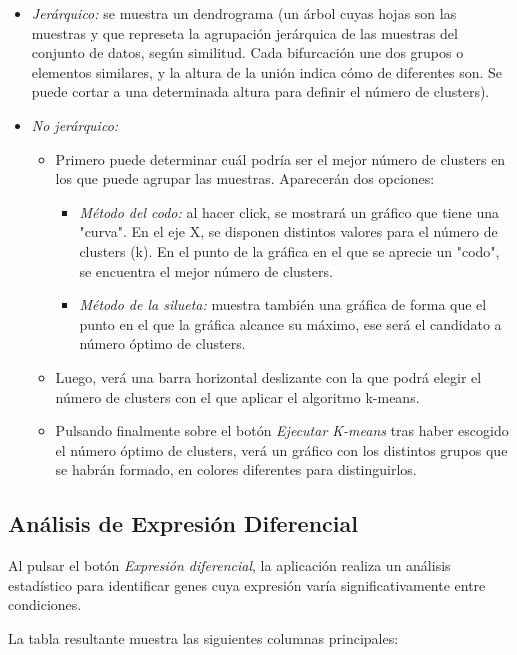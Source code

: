 \begin{itemize}
    \item \textit{Jerárquico:} se muestra un dendrograma (un árbol cuyas hojas son las muestras y que represeta la agrupación jerárquica de las muestras del conjunto de datos, según 
    similitud. Cada bifurcación une dos grupos o elementos similares, y la altura de la unión indica cómo de diferentes son. Se puede cortar a una
    determinada altura para definir el número de clusters).
    \item \textit{No jerárquico:}
    \begin{itemize}
        \item Primero puede determinar cuál podría ser el mejor número de clusters en los que puede agrupar las muestras. Aparecerán dos opciones:
        \begin{itemize}
            \item \textit{Método del codo:} al hacer click, se mostrará un gráfico que tiene una "curva". En el eje X, se disponen distintos valores para 
            el número de clusters (k). En el punto de la gráfica en el que se aprecie un "codo", se encuentra el mejor número de clusters.
            \item \textit{Método de la silueta:} muestra también una gráfica de forma que el punto en el que la gráfica alcance su máximo, ese será el candidato
            a número óptimo de clusters.
        \end{itemize}
        \item Luego, verá una barra horizontal deslizante con la que podrá elegir el número de clusters con el que aplicar el algoritmo k-means.
        \item Pulsando finalmente sobre el botón \textit{Ejecutar K-means} tras haber escogido el número óptimo de clusters, verá un gráfico con los distintos grupos
        que se habrán formado, en colores diferentes para distinguirlos.
    \end{itemize}
\end{itemize}


\subsection{Análisis de Expresión Diferencial}

Al pulsar el botón \textit{Expresión diferencial}, la aplicación realiza un análisis estadístico para identificar genes cuya expresión varía significativamente entre condiciones.

La tabla resultante muestra las siguientes columnas principales:

